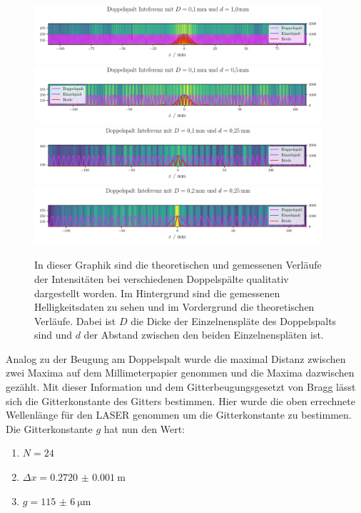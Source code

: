 \documentclass[12pt,english,ngerman]{scrartcl}
\begin{document}
\begin{figure}[H]
	\centering
	\includegraphics[width=0.95\textwidth]{figures/intensity_1.pdf}
	\includegraphics[width=0.95\textwidth]{figures/intensity_2.pdf}
	\includegraphics[width=0.95\textwidth]{figures/intensity_3.pdf}
	\includegraphics[width=0.95\textwidth]{figures/intensity_4.pdf}
	\caption{In dieser Graphik sind die theoretischen und
  gemessenen Verläufe der Intensitäten bei verschiedenen Doppelspälte 
  qualitativ dargestellt worden. Im Hintergrund sind die gemessenen 
  Helligkeitsdaten zu sehen und im Vordergrund die theoretischen Verläufe.
Dabei ist $D$ die Dicke der Einzelnenspläte des Doppelspalts sind und 
$d$ der Abstand zwischen den beiden Einzelnenspläten ist. }\label{fig:auswertung_intensity}
\end{figure}

Analog zu der Beugung am Doppelspalt wurde die maximal Distanz zwischen zwei
Maxima auf dem Millimeterpapier genommen und die Maxima dazwischen gezählt. Mit
dieser Information und dem Gitterbeugungsgesetzt von Bragg lässt sich die
Gitterkonstante des Gitters bestimmen. Hier wurde die oben errechnete
Wellenlänge für den LASER genommen um die Gitterkonstante zu bestimmen. Die
Gitterkonstante $g$ hat nun den Wert:

\begin{enumerate}
	\item $N = \num{24}$
	\item $\Delta x = \SI{0.2720(10)}{\m}$
	\item $g = \SI{115(6)}{\um}$
\end{enumerate}
\end{document}
